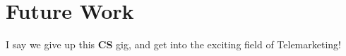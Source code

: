 \section{Future Work}

I say we give up this \textbf{CS} gig, and get into the exciting field of Telemarketing!
